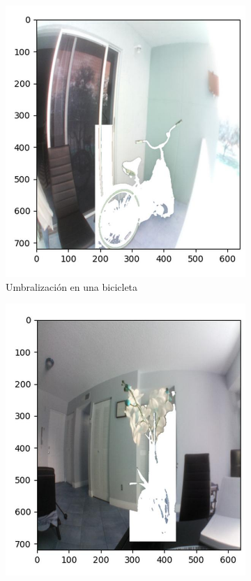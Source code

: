 \begin{figure}[H]
     \centering
     \begin{subfigure}[b]{0.4\textwidth}
        \centering
        \includegraphics[scale=0.35]{Recursos/otsu_bike.jpg}
        \caption{Umbralización en una bicicleta}
        \label{otsu_bike}
     \end{subfigure}
     \hfill
     \begin{subfigure}[b]{0.4\textwidth}
        \centering
        \includegraphics[scale=0.35]{Recursos/otsu_position.jpg}

\end{subfigure}
\end{figure}
